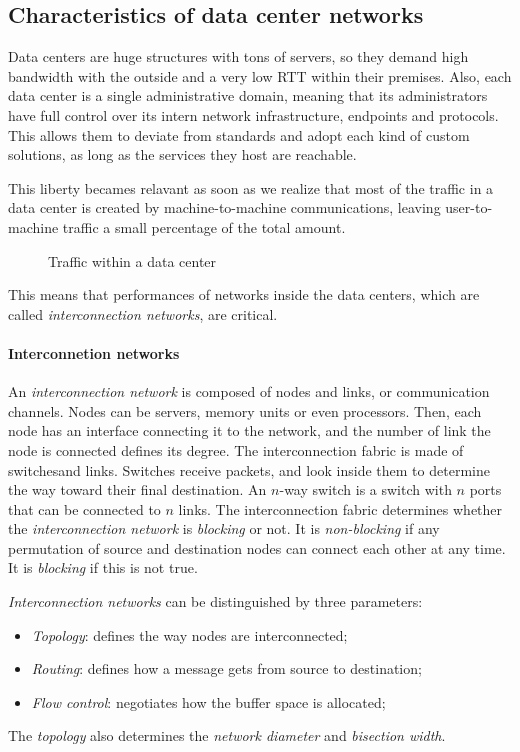 \subsection{Characteristics of data center networks}
Data centers are huge structures with tons of servers, so they demand high
bandwidth with the outside and a very low RTT within their premises. Also,
each data center is a single administrative domain, meaning that its
administrators have full control over its intern network infrastructure, 
endpoints and protocols. This allows them to deviate from standards and adopt
each kind of custom solutions, as long as the services they host are reachable.

This liberty becames relavant as soon as we realize that most of the traffic
in a data center is created by machine-to-machine communications, leaving
user-to-machine traffic a small percentage of the total amount. 

\begin{figure}[h!]
    \centering
    \caption{Traffic within a data center}
\end{figure}

\noindent
This means that performances of networks inside the data centers, which
are called \emph{interconnection networks}, are critical.

\paragraph{Interconnetion networks}
An \emph{interconnection network} is composed of nodes and links, or communication
channels. Nodes can be servers, memory units or even processors. Then, each node
has an interface connecting it to the network, and the number of link the node
is connected defines its degree. The interconnection fabric is made of
switches\footnotemark and links. Switches receive packets, and look inside them
to determine the way toward their final destination. An $n$-way switch is a
switch with $n$ ports that can be connected to $n$ links. The interconnection
fabric determines whether the \emph{interconnection network} is \emph{blocking}
or not. It is \emph{non-blocking} if any permutation of source and destination
nodes can connect each other at any time. It is \emph{blocking} if this is not
true.


\bigskip\noindent
\emph{Interconnection networks} can be distinguished by three parameters:
\begin{itemize}
    \item \emph{Topology}: defines the way nodes are interconnected;
    \item \emph{Routing}: defines how a message gets from source to destination;
    \item \emph{Flow control}: negotiates how the buffer space is allocated;
\end{itemize}
The \emph{topology} also determines the \emph{network diameter} and
\emph{bisection width}.


